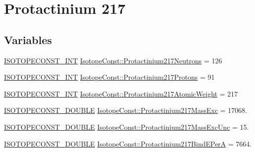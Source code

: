 \hypertarget{group___isotope_const-_protactinium-_pa217}{}\section{Protactinium 217}
\label{group___isotope_const-_protactinium-_pa217}
\subsection*{Variables}
\begin{DoxyCompactItemize}
\item 
\mbox{\hyperlink{group___isotope_const-_macros_ga5f18360b3e99483a35c32d789e62621c}{I\+S\+O\+T\+O\+P\+E\+C\+O\+N\+S\+T\+\_\+\+I\+NT}} \mbox{\hyperlink{group___isotope_const-_protactinium-_pa217_ga99fdc5d63b2468a2910f874373662b15}{Isotope\+Const\+::\+Protactinium217\+Neutrons}} = 126
\item 
\mbox{\hyperlink{group___isotope_const-_macros_ga5f18360b3e99483a35c32d789e62621c}{I\+S\+O\+T\+O\+P\+E\+C\+O\+N\+S\+T\+\_\+\+I\+NT}} \mbox{\hyperlink{group___isotope_const-_protactinium-_pa217_ga4803d18323fce9068d87a7814c160064}{Isotope\+Const\+::\+Protactinium217\+Protons}} = 91
\item 
\mbox{\hyperlink{group___isotope_const-_macros_ga5f18360b3e99483a35c32d789e62621c}{I\+S\+O\+T\+O\+P\+E\+C\+O\+N\+S\+T\+\_\+\+I\+NT}} \mbox{\hyperlink{group___isotope_const-_protactinium-_pa217_ga4296e2aeab5e8f8d2cbce3bcac97be82}{Isotope\+Const\+::\+Protactinium217\+Atomic\+Weight}} = 217
\item 
\mbox{\hyperlink{group___isotope_const-_macros_ga8f45a7272ce02c0b4c65c44636ed719a}{I\+S\+O\+T\+O\+P\+E\+C\+O\+N\+S\+T\+\_\+\+D\+O\+U\+B\+LE}} \mbox{\hyperlink{group___isotope_const-_protactinium-_pa217_ga8a22e626e0aa29706cae01dbb4b139c0}{Isotope\+Const\+::\+Protactinium217\+Mass\+Exc}} = 17068.
\item 
\mbox{\hyperlink{group___isotope_const-_macros_ga8f45a7272ce02c0b4c65c44636ed719a}{I\+S\+O\+T\+O\+P\+E\+C\+O\+N\+S\+T\+\_\+\+D\+O\+U\+B\+LE}} \mbox{\hyperlink{group___isotope_const-_protactinium-_pa217_gafb07993d74d5de38c842f5164b2222ec}{Isotope\+Const\+::\+Protactinium217\+Mass\+Exc\+Unc}} = 15.
\item 
\mbox{\hyperlink{group___isotope_const-_macros_ga8f45a7272ce02c0b4c65c44636ed719a}{I\+S\+O\+T\+O\+P\+E\+C\+O\+N\+S\+T\+\_\+\+D\+O\+U\+B\+LE}} \mbox{\hyperlink{group___isotope_const-_protactinium-_pa217_ga13d7fc0a2aaaa8dc75f91432bc67ddac}{Isotope\+Const\+::\+Protactinium217\+Bind\+E\+PerA}} = 7664.

\end{DoxyCompactItemize}
